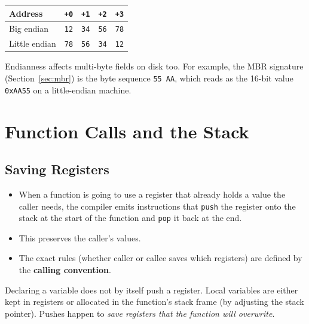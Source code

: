 \documentclass{article}
\begin{document}
\begin{table}[H]
	\centering
	\begin{tabular}{lcccc}
		\toprule
		\textbf{Address} & \texttt{+0} & \texttt{+1} & \texttt{+2} & \texttt{+3} \\
		\midrule
		Big endian & \texttt{12} & \texttt{34} & \texttt{56} & \texttt{78} \\
		Little endian & \texttt{78} & \texttt{56} & \texttt{34} & \texttt{12} \\
		\bottomrule
	\end{tabular}
\end{table}

\begin{extra}
	Endianness affects multi-byte fields on disk too. For example, the MBR signature (Section~\ref{sec:mbr}) is the byte sequence \texttt{55 AA}, which reads as the 16-bit value \texttt{0xAA55} on a little-endian machine.
\end{extra}

\section{Function Calls and the Stack}
\label{sec:functions}

\subsection{Saving Registers}
\begin{itemize}
	\item When a function is going to use a register that already holds a value the caller needs, the compiler emits instructions that \texttt{push} the register onto the stack at the start of the function and \texttt{pop} it back at the end.
	\item This preserves the caller's values.
	\item The exact rules (whether caller or callee saves which registers) are defined by the \textbf{calling convention}.
\end{itemize}

\begin{pitfall}
	Declaring a variable does not by itself push a register. Local variables are either kept in registers or allocated in the function's stack frame (by adjusting the stack pointer). Pushes happen to \emph{save registers that the function will overwrite}.
\end{pitfall}
\end{document}
